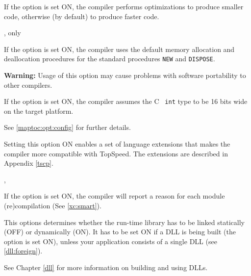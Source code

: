 \begin{description}
\ifgencode
{}
        \MLBegin{}\ModeC{}\MLEnd{}

        If the option is set ON, the compiler performs optimizations
        to produce smaller code, otherwise (by default)
        to produce faster code.
\fi

        \MLBegin{}\ModeC{}, \mt{} only\MLEnd{} \header

        If the option is set ON, the compiler uses the default memory
        allocation and deallocation procedures for the
        standard procedures \verb'NEW' and \verb'DISPOSE'.

        {\bf Warning:} Usage of this option may cause problems
        with software portability to other compilers.

\ifgenc
{}
        \MLBegin{}\ModeC{}\MLEnd{}

        If the option is set ON, the compiler assumes the C {\tt
        int} type to be 16 bits wide on the target platform.

        See \ref{maptoc:opt:config} for further details.
\fi

\iftopspeed
{}
        \MLBegin{}\ModeC{}\MLEnd{}

        Setting this option ON enables a set of language extensions that
        makes the compiler more compatible with TopSpeed.
        The extensions are described in Appendix \ref{tscp}.
\fi

        \MLBegin{}\ModeM{},\ModeP{}\MLEnd{}

        If the option is set ON, the compiler will report
        a reason for each module (re)compilation (See \ref{xc:smart}).

\ifgencode
\ifdll
{}
        \MLBegin{}\ModeC{}\MLEnd{}

        This options determines whether the run-time library has to be
        linked statically (OFF) or dynamically (ON). It has to be set ON if a DLL
        is being built (the  option is set ON), unless
        your application consists of a single DLL (see \ref{dll:foreign}).

        See Chapter \ref{dll} for more information on building
        and using DLLs.
\fi
\fi

        \MLBegin{}\ModeC{}\MLEnd{}


\end{description}

